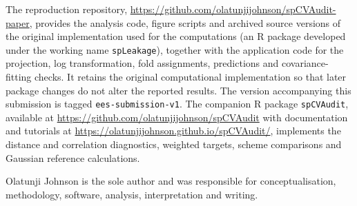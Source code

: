 \documentclass[pdflatex,sn-basic]{sn-jnl}
\begin{document}
The reproduction repository, \url{https://github.com/olatunjijohnson/spCVAudit-paper}, provides the analysis code, figure scripts and archived source versions of the original implementation used for the computations (an R package developed under the working name \texttt{spLeakage}), together with the application code for the projection, log transformation, fold assignments, predictions and covariance-fitting checks. It retains the original computational implementation so that later package changes do not alter the reported results. The version accompanying this submission is tagged \texttt{ees-submission-v1}. The companion R package \texttt{spCVAudit}, available at \url{https://github.com/olatunjijohnson/spCVAudit} with documentation and tutorials at \url{https://olatunjijohnson.github.io/spCVAudit/}, implements the distance and correlation diagnostics, weighted targets, scheme comparisons and Gaussian reference calculations.

Olatunji Johnson is the sole author and was responsible for conceptualisation, methodology, software, analysis, interpretation and writing.
\endgroup


\end{document}
